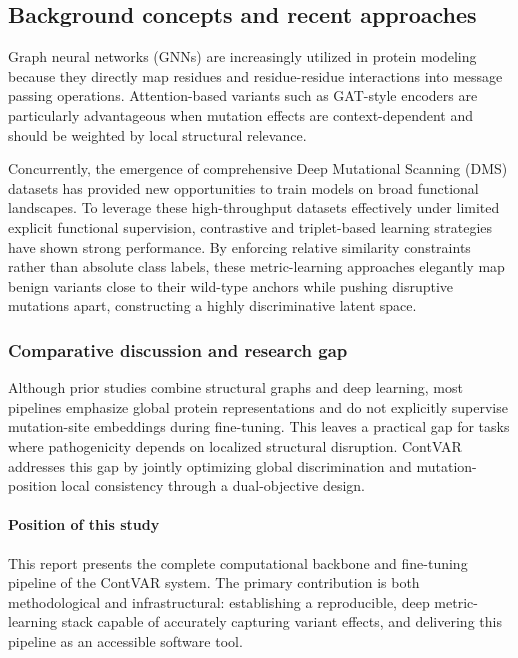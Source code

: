 \documentclass[unnumsec,webpdf,contemporary,large]{oup-authoring-template}%
\theoremstyle{thmstyleone}%
\theoremstyle{thmstyletwo}%
\theoremstyle{thmstylethree}%
\begin{document}
\subsection{Background concepts and recent approaches}\label{subsec1}
Graph neural networks (GNNs) are increasingly utilized in protein modeling because they directly map residues and residue-residue interactions into message passing operations. Attention-based variants such as GAT-style encoders are particularly advantageous when mutation effects are context-dependent and should be weighted by local structural relevance. 

Concurrently, the emergence of comprehensive Deep Mutational Scanning (DMS) datasets has provided new opportunities to train models on broad functional landscapes. To leverage these high-throughput datasets effectively under limited explicit functional supervision, contrastive and triplet-based learning strategies have shown strong performance. By enforcing relative similarity constraints rather than absolute class labels, these metric-learning approaches elegantly map benign variants close to their wild-type anchors while pushing disruptive mutations apart, constructing a highly discriminative latent space.




\subsubsection{Comparative discussion and research gap}\label{subsubsec1}
Although prior studies combine structural graphs and deep learning, most pipelines emphasize global protein representations and do not explicitly supervise mutation-site embeddings during fine-tuning. This leaves a practical gap for tasks where pathogenicity depends on localized structural disruption. ContVAR addresses this gap by jointly optimizing global discrimination and mutation-position local consistency through a dual-objective design.

\paragraph{Position of this study}
This report presents the complete computational backbone and fine-tuning pipeline of the ContVAR system. The primary contribution is both methodological and infrastructural: establishing a reproducible, deep metric-learning stack capable of accurately capturing variant effects, and delivering this pipeline as an accessible software tool.
\end{document}

